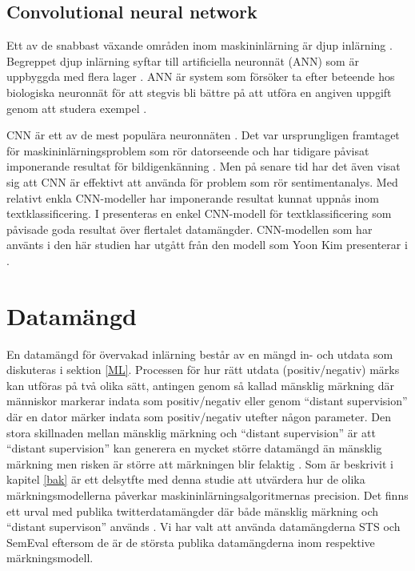 \documentclass{kaumasters} %
\begin{document}
\subsection{Convolutional neural network}\label{bak:cnn}
Ett av de snabbast växande områden inom maskininlärning är djup inlärning \cite{TSAsurvey}. Begreppet djup inlärning syftar till artificiella neuronnät (ANN) som är uppbyggda med flera lager  \cite{cnn:001}. ANN är system som försöker ta efter beteende hos biologiska neuronnät för att stegvis bli bättre på att utföra en angiven uppgift genom att studera exempel \cite{wiki:015}. 

CNN är ett av de mest populära neuronnäten  \cite{cnn:001}. Det var ursprungligen framtaget för maskininlärningsproblem som rör datorseende och har tidigare påvisat imponerande resultat för bildigenkänning \cite{cnn:003, cnn:006}. Men på senare tid har det även visat sig att CNN är effektivt att använda för problem som rör sentimentanalys. Med relativt enkla CNN-modeller har imponerande resultat kunnat uppnås inom textklassificering.  I \cite{cnn:003} presenteras en enkel CNN-modell för textklassificering som påvisade goda resultat över flertalet datamängder. CNN-modellen som har använts i den här studien har utgått från den modell som Yoon Kim presenterar i \cite{cnn:003}.

\section{Datamängd} \label{DS}
En datamängd för övervakad inlärning består av en mängd in- och utdata som diskuteras i sektion \ref{ML}. Processen för hur rätt utdata (positiv/negativ) märks kan utföras på två olika sätt, antingen genom så kallad mänsklig märkning där människor markerar indata som positiv/negativ eller genom “distant supervision” där en dator märker indata som positiv/negativ utefter någon parameter. Den stora skillnaden mellan mänsklig märkning och “distant supervision” är att “distant supervision” kan generera en mycket större datamängd än mänsklig märkning men risken är större att märkningen blir felaktig \cite{TSAsurvey}. 
Som är beskrivit i kapitel \ref{bak} är ett delsytfte med denna studie att utvärdera hur de olika märkningsmodellerna påverkar maskininlärningsalgoritmernas precision. Det finns ett urval med publika twitterdatamängder där både mänsklig märkning och “distant supervison” används \cite{TSAsurvey}. Vi har valt att använda datamängderna STS \cite{sts:001} och SemEval \cite{SemEval:001} eftersom de är de största publika datamängderna inom respektive märkningsmodell.
\end{document}
